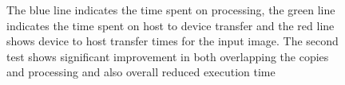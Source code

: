 \begin{figure}[ht]
    \centering
    \caption{The blue line indicates the time spent on processing, the green line indicates the time spent on host to device transfer and the red line shows device to host transfer times for the input image. The second test shows significant improvement in both overlapping the copies and processing and also overall reduced execution time}
    \label{fig:compression_road}
\end{figure}
